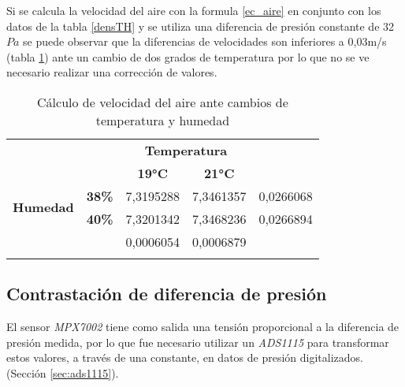Si se calcula la velocidad del aire con la formula \ref{ec_aire} en conjunto con los datos de la tabla \ref{densTH} y se utiliza una diferencia de presión constante de 32$Pa$ se puede observar que la diferencias de velocidades son inferiores a 0,03m/s (tabla \ref{velTH}) ante un cambio de dos grados de temperatura por lo que no se ve necesario realizar una corrección de valores.


\begin{table}[H]
	\centering
	\begin{tabular}{ll|l|l|l|} 
		\cline{3-4}
		&                                    & \multicolumn{2}{c|}{\textbf{Temperatura}}                                                     & \multicolumn{1}{l}{}                           \\ 
		\cline{3-4}
		&                                    & \multicolumn{1}{c|}{\textbf{19°C}}            & \multicolumn{1}{c|}{\textbf{21°C}}            & \multicolumn{1}{c}{\textbf{}}                  \\ 
		\hline
		\multicolumn{1}{|c|}{\multirow{2}{*}{\textbf{Humedad}}} & \multicolumn{1}{r|}{\textbf{38\%}} & 7,3195288                                     & 7,3461357                                     & {\cellcolor[rgb]{0.816,0.816,0.816}}0,0266068  \\ 
		\hhline{|~----|}
		\multicolumn{1}{|c|}{}                                  & \multicolumn{1}{r|}{\textbf{40\%}} & 7,3201342                                     & 7,3468236                                     & {\cellcolor[rgb]{0.816,0.816,0.816}}0,0266894  \\ 
		\hline
		& \multicolumn{1}{c|}{\textbf{}}     & {\cellcolor[rgb]{0.816,0.816,0.816}}0,0006054 & {\cellcolor[rgb]{0.816,0.816,0.816}}0,0006879 & \multicolumn{1}{l}{}                           \\
		\hhline{~~--~}
	\end{tabular}
	\caption{Cálculo de velocidad del aire ante cambios de temperatura y humedad}
	\label{velTH}
\end{table}

\subsection{Contrastación de diferencia de presión}

El sensor \textit{MPX7002} tiene como salida una tensión proporcional a la diferencia de presión medida, por lo que fue necesario utilizar un \textit{ADS1115} para transformar estos valores, a través de una constante, en datos de presión digitalizados. (Sección \ref{sec:ads1115}).

